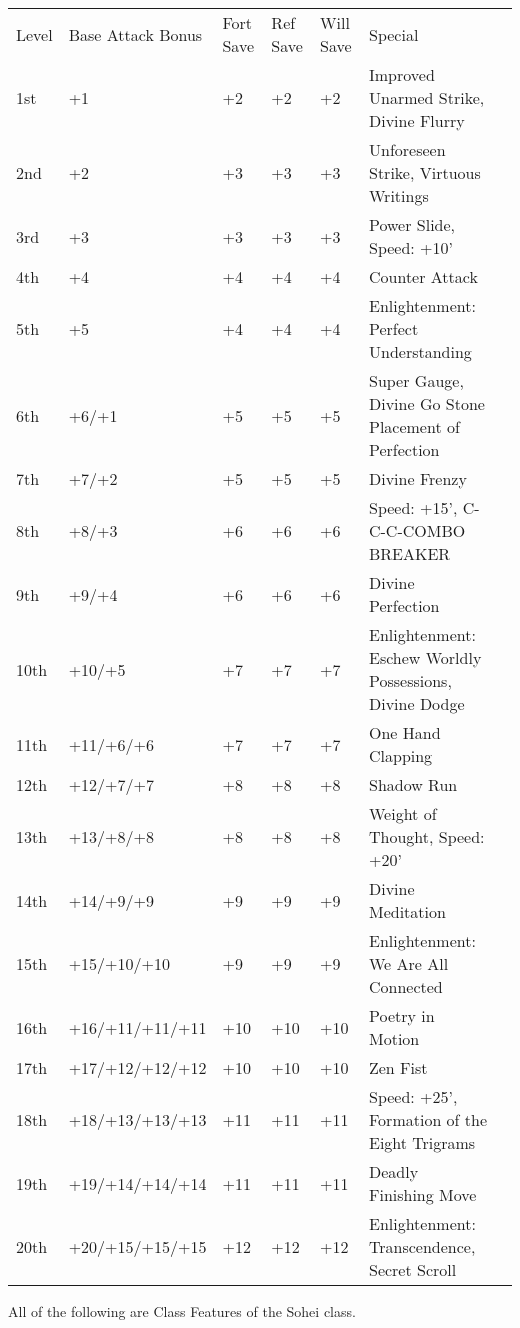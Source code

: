 \begin{table}[tbh]
\begin{small}
\begin{tabular}{lp{3cm}p{0.7cm}p{0.7cm}p{0.7cm}p{9cm}l}
Level  &Base Attack Bonus &Fort Save &Ref Save &Will Save &Special\\
1st &+1 &+2 &+2 &+2 &Improved Unarmed Strike, Divine Flurry\\
2nd &+2 &+3 &+3 &+3 &Unforeseen Strike, Virtuous Writings\\
3rd &+3 &+3 &+3 &+3 &Power Slide, Speed: +10'\\
4th &+4 &+4 &+4 &+4 &Counter Attack\\
5th &+5 &+4 &+4 &+4 &Enlightenment: Perfect Understanding\\
6th &+6/+1 &+5 &+5 &+5 &Super Gauge, Divine Go Stone Placement of Perfection\\
7th &+7/+2 &+5 &+5 &+5 &Divine Frenzy\\
8th &+8/+3 &+6 &+6 &+6 &Speed: +15', C-C-C-COMBO BREAKER\\
9th &+9/+4 &+6 &+6 &+6 &Divine Perfection\\
10th &+10/+5 &+7 &+7 &+7 &Enlightenment: Eschew Worldly Possessions, Divine Dodge\\
11th &+11/+6/+6 &+7 &+7 &+7 &One Hand Clapping\\
12th &+12/+7/+7 &+8 &+8 &+8 &Shadow Run\\
13th &+13/+8/+8 &+8 &+8 &+8 &Weight of Thought, Speed: +20'\\
14th &+14/+9/+9 &+9 &+9 &+9 &Divine Meditation\\
15th &+15/+10/+10 &+9 &+9 &+9 &Enlightenment: We Are All Connected\\
16th &+16/+11/+11/+11 &+10 &+10 &+10 &Poetry in Motion\\
17th &+17/+12/+12/+12 &+10 &+10 &+10 &Zen Fist\\
18th &+18/+13/+13/+13 &+11 &+11 &+11 &Speed: +25', Formation of the Eight Trigrams\\
19th &+19/+14/+14/+14 &+11 &+11 &+11 &Deadly Finishing Move\\
20th &+20/+15/+15/+15 &+12 &+12 &+12 &Enlightenment: Transcendence, Secret Scroll \\
\end{tabular}
\end{small}
\end{table}

\smallskip\noindent All of the following are Class Features of the Sohei class.

